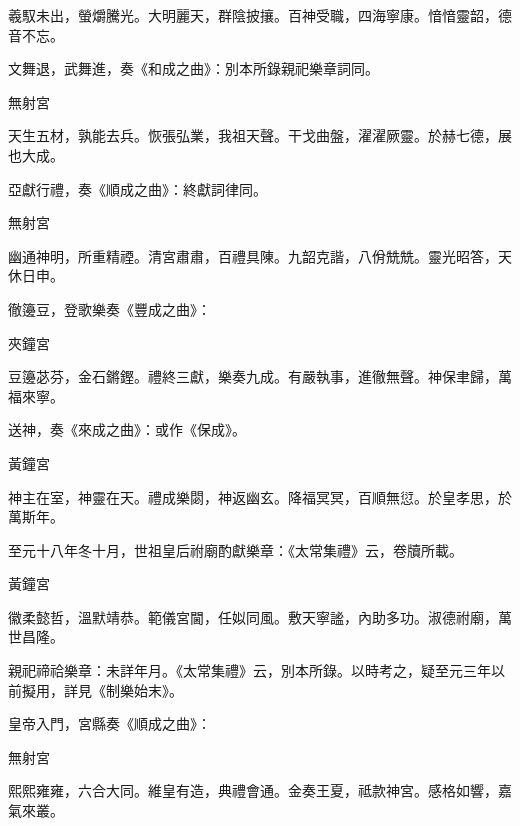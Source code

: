 \begin{pinyinscope}
 羲馭未出，螢爝騰光。大明麗天，群陰披攘。百神受職，四海寧康。愔愔靈韶，德音不忘。



 文舞退，武舞進，奏《和成之曲》：別本所錄親祀樂章詞同。



 無射宮



 天生五材，孰能去兵。恢張弘業，我祖天聲。干戈曲盤，濯濯厥靈。於赫七德，展也大成。



 亞獻行禮，奏《順成之曲》：終獻詞律同。



 無射宮



 幽通神明，所重精禋。清宮肅肅，百禮具陳。九韶克諧，八佾兟兟。靈光昭答，天休日申。



 徹籩豆，登歌樂奏《豐成之曲》：



 夾鐘宮



 豆籩苾芬，金石鏘鏗。禮終三獻，樂奏九成。有嚴執事，進徹無聲。神保聿歸，萬福來寧。



 送神，奏《來成之曲》：或作《保成》。



 黃鐘宮



 神主在室，神靈在天。禮成樂閟，神返幽玄。降福冥冥，百順無愆。於皇孝思，於萬斯年。



 至元十八年冬十月，世祖皇后祔廟酌獻樂章：《太常集禮》云，卷牘所載。



 黃鐘宮



 徽柔懿哲，溫默靖恭。範儀宮閫，任姒同風。敷天寧謐，內助多功。淑德祔廟，萬世昌隆。



 親祀禘祫樂章：未詳年月。《太常集禮》云，別本所錄。以時考之，疑至元三年以前擬用，詳見《制樂始末》。



 皇帝入門，宮縣奏《順成之曲》：



 無射宮



 熙熙雍雍，六合大同。維皇有造，典禮會通。金奏王夏，祗款神宮。感格如響，嘉氣來叢。




\end{pinyinscope}
